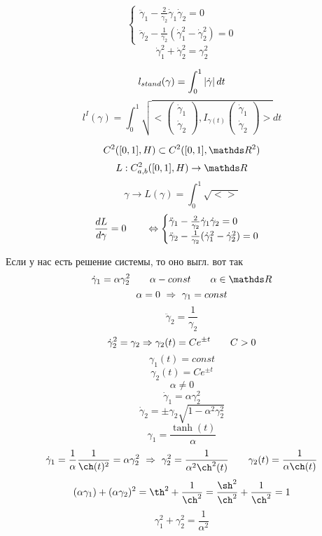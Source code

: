 \documentclass[main]{subfiles}
\begin{document}
    \begin{Sol}
        \[\begin{cases}
            \ddot{\gamma}_1 - \frac{2}{\gamma_2} \dot{\gamma}_1 \dot{\gamma}_2 = 0\\
            \ddot{\gamma}_2 - \frac{1}{\gamma_2} (\dot{\gamma}_1^2 - \dot{\gamma}_2^2) = 0
        \end{cases}\]
        \[\dot{\gamma}_1^2 + \dot{\gamma}_2^2 = \gamma_2^2\]

        \[l_{stand}(\gamma) = \int_0^1 \left|\dot{\gamma}\right|dt \]
        \[l^I(\gamma) = \int_0^1 \sqrt{<\begin{pmatrix}
            \dot{\gamma}_1\\
            \dot{\gamma}_2
            \end{pmatrix}, I_{\gamma(t)}  \begin{pmatrix}
            \dot{\gamma}_1\\
            \dot{\gamma}_2
        \end{pmatrix}>}dt\]
    \end{Sol}

    \[C^2([0, 1], H) \subset C^2([0, 1], \R^2)\]
    \[L: C^2_{a,b}([0, 1], H) \to \R \]
    \[\gamma \to L(\gamma) = \int_0^1 \sqrt{ <>}\]
    \[\frac{dL}{d\gamma} = 0 \qquad \Leftrightarrow \begin{cases}
            \ddot{\gamma}_1 - \frac{2}{\gamma_2} \dot{\gamma}_1 \dot{\gamma}_2 = 0\\
            \ddot{\gamma}_2 - \frac{1}{\gamma_2} (\dot{\gamma}_1^2 - \dot{\gamma}_2^2) = 0
        \end{cases} \]

        Если у нас есть решение системы, то оно выгл. вот так
    \[\dot{\gamma}_1 = \alpha \gamma_2^2 \qq \alpha - const \qq \alpha \in \R\]
    \[\alpha = 0 \ \Rightarrow\ \gamma_1 = const\]
    \[\ddot{\gamma}_2 = \frac{1}{\gamma_2}\]
    \[\dot{\gamma}_2^2 = \gamma_2  \Rightarrow \gamma_2(t) = C e^{\pm t} \qquad C > 0 \]
    \[\gamma_1(t) = const\]
    \[\gamma_2(t) = Ce^{\pm t}\]
    \[\alpha \neq 0\]
    \[\dot{\gamma}_1 = \alpha \gamma_2^2\]
    \[\dot{\gamma}_2 = \pm \gamma_2 \sqrt{ 1 - \alpha^2 \gamma_2^2}\]
    \[\gamma_1 = \frac{\tanh (t)}{\alpha}\]
    \[\dot{\gamma}_1 = \frac{1}{\alpha} \frac{1}{\ch(t)^2} = \alpha \gamma_2^2  \ \Ra \
    \gamma_2^2 = \frac{1}{\alpha^2 \ch^2(t)}  \qq \gamma_2(t) = \frac{1}{\alpha \ch(t)}\]
    \[(\alpha \gamma_1) + (\alpha \gamma_2)^2  = \th^2 + \frac{1}{\ch^2} = \frac{\sh^2}{\ch^2} +
    \frac{1}{\ch^2} = 1\]
    \[\gamma_1^2 + \gamma_2^2 = \frac{1}{\alpha^2}\]
\end{document}
